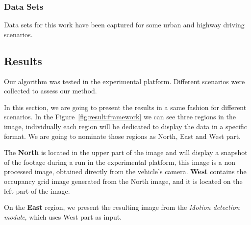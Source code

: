 \subsubsection*{Data Sets}
Data sets for this work have been captured for some urban and highway driving scenarios.

\subsection{Results}

Our algorithm was tested in the experimental platform. Different scenarios were collected to assess our method.

In this section, we are going to present the results in a same fashion for different scenarios. In the Figure~\ref{fig:result:framework} we can see three regions in the image, individually each region will be dedicated to display the data in a specific format. We are going to nominate those regions as North, East and West part. 

The \textbf{North} is located in the upper part of the image and will display a snapshot of the footage during a run in the experimental platform, this image is a non processed image, obtained directly from the vehicle's camera. \textbf{West} contains the occupancy grid image generated from the North image, and it is located on the left part of the image.

On the \textbf{East} region, we present the resulting image from the \textit{Motion detection module}, which uses West part as input.

